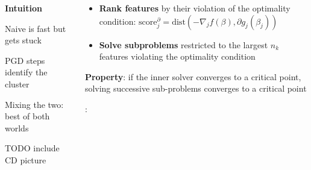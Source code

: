 \documentclass[english,final,t]{beamer}
\begin{document}
\begin{frame}{}
\begin{columns}[t]
\begin{column}{.3\linewidth}
	\begin{block}{\textbf{\color{malgared} Intuition}}

	Naive is fast but gets stuck

	PGD steps identify the cluster

	Mixing the two: best of both worlds

	TODO include CD picture

	\end{block}
\end{column}
\begin{column}{.3\linewidth}
	\begin{block}{\textbf{\color{malgared}{\# 1 Features Priorization}}}
		\begin{itemize}
			\item
			\textbf{Rank features} by their violation of the optimality condition:
			  $\mathrm{score}^\partial_j = \mathrm{dist}(-\nabla_j f (\beta), \partial g_j (\beta_j))$
			\item \textbf{Solve subproblems} restricted to the largest $n_k$ features violating the optimality condition
		\end{itemize}
		\textbf{\color{malgared}Property}: if the inner solver converges to a critical point, solving successive sub-problems converges to a critical point
		\end{block}
	\begin{block}{\textbf{\color{malgared}{\# 2 Support Identification}}}
		{\color{malgared}{Assumptions}}:
		\begin{itemize}

\end{itemize}
\end{block}
\end{column}
\end{columns}
\end{frame}
\end{document}
